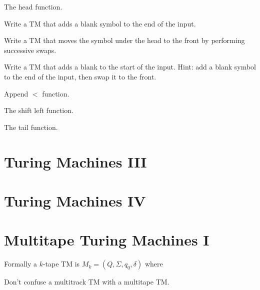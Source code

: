 \frmrule

\begin{example}
The head function. 


\end{example}

\frmrule

\begin{example}
Write a TM that adds a blank symbol to the end of the input.
\end{example}

\begin{example}
Write a TM that moves the symbol under the head 
to the front by performing successive swaps. 
\end{example}

\begin{example}
Write a TM that adds a blank to the start of the input. 
Hint: add a blank symbol to the end of the input, then 
swap it to the front. 
\end{example}

\begin{example}
Append $<$ function. 
\end{example}

\frmrule

\begin{example}
The shift left function. 
\end{example}
\begin{example}
The tail function. 
\end{example}



\section{Turing Machines III}

\section{Turing Machines IV}

\section{Multitape Turing Machines I}


Formally a $k$-tape TM is $M_k = (Q,\Sigma,q_0,\delta)$ 
where 

Don't confuse a multitrack TM with a multitape TM.

